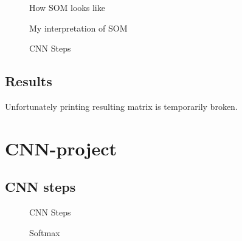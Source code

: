 \documentclass[]{report}
\begin{document}
\begin{figure}[H]
\centering
\caption{How SOM looks like}
\end{figure}

\begin{figure}[H]
\centering
\caption{My interpretation of SOM}
\end{figure}


\begin{figure}[H]
\centering
\caption{CNN Steps}
\end{figure}
\subsection{Results}
Unfortunately printing resulting matrix is temporarily broken.
\section{CNN-project}
\subsection{CNN steps}
\begin{figure}[H]
\centering
\caption{CNN Steps}
\end{figure}
\begin{figure}[H]
\centering
\caption{Softmax}
\end{figure}
\end{document}
